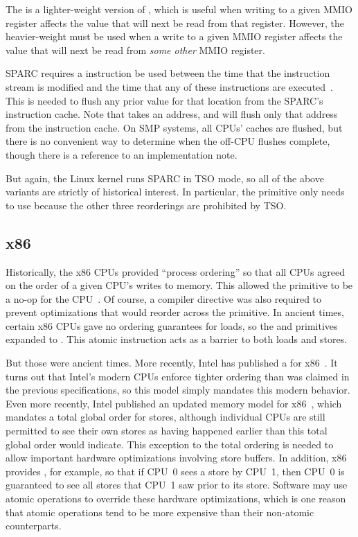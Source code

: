 The  is a lighter-weight version of
, which is useful when writing to a given MMIO register
affects the value that will next be read from that register.
However, the heavier-weight  must be used when
a write to a given MMIO register affects the value that will next be
read from {\em some other} MMIO register.

SPARC requires a  instruction be used between the time that
the instruction stream is modified and the time that any of these
instructions are executed~\cite{SPARC94}.
This is needed to flush any prior value for that location from
the SPARC's instruction cache.
Note that  takes an address, and will flush only that address
from the instruction cache.
On SMP systems, all CPUs' caches are flushed, but there is no
convenient way to determine when the off-CPU flushes complete,
though there is a reference to an implementation note.

But again, the Linux kernel runs SPARC in TSO mode, so
all of the above  variants are strictly of historical
interest.
In particular, the  primitive only needs to use 
because the other three reorderings are prohibited by TSO\@.

\subsection{x86}

Historically, the x86 CPUs provided ``process ordering'' so that all CPUs
agreed on the order of a given CPU's writes to memory.
This allowed the 
primitive to be a no-op for the CPU~\cite{IntelXeonV3-96a}.
Of course, a compiler directive was also required to prevent optimizations
that would reorder across the  primitive.
In ancient times, certain x86 CPUs gave no ordering guarantees for loads, so
the  and  primitives expanded to .
This atomic instruction acts as a barrier to both loads and stores.

But those were ancient times.
More recently, Intel has published a
 for
x86~\cite{Intelx86MemoryOrdering2007}.
It turns out that Intel's modern CPUs enforce tighter ordering than was
claimed in the previous specifications, so this model simply mandates
this modern behavior.
Even more recently, Intel published an updated memory model for
x86~\cite[Section 8.2]{Intel64IA32v3A2011}, which mandates a total global order
for stores, although individual CPUs are still permitted to see their
own stores as having happened earlier than this total global order
would indicate.
This exception to the total ordering is needed to allow important
hardware optimizations involving store buffers.
In addition, x86 provides
, for example,
so that if CPU~0 sees a store by CPU~1, then CPU~0 is guaranteed to see
all stores that CPU~1 saw prior to its store.
Software may use atomic operations to override these hardware optimizations,
which is one reason that atomic operations tend to be more expensive
than their non-atomic counterparts.

